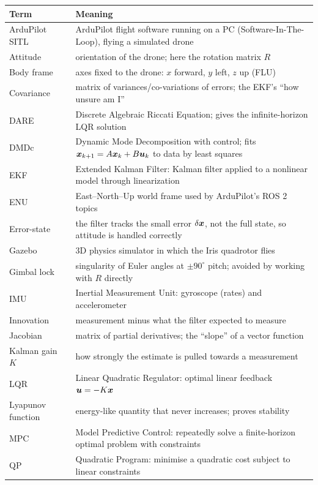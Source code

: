\begin{center}\small
\begin{tabularx}{\linewidth}{@{}l X@{}}
\toprule
\textbf{Term} & \textbf{Meaning}\\
\midrule
ArduPilot SITL & ArduPilot flight software running on a PC (Software-In-The-Loop), flying a simulated drone\\
Attitude & orientation of the drone; here the rotation matrix $R$\\
Body frame & axes fixed to the drone: $x$ forward, $y$ left, $z$ up (FLU)\\
Covariance & matrix of variances/co-variations of errors; the EKF's ``how unsure am I''\\
DARE & Discrete Algebraic Riccati Equation; gives the infinite-horizon LQR solution\\
DMDc & Dynamic Mode Decomposition with control; fits $\bm{x}_{k+1}=A\bm{x}_k+B\bm{u}_k$ to data by least squares\\
EKF & Extended Kalman Filter: Kalman filter applied to a nonlinear model through linearization\\
ENU & East--North--Up world frame used by ArduPilot's ROS 2 topics\\
Error-state & the filter tracks the small error $\delta\bm{x}$, not the full state, so attitude is handled correctly\\
Gazebo & 3D physics simulator in which the Iris quadrotor flies\\
Gimbal lock & singularity of Euler angles at $\pm90^\circ$ pitch; avoided by working with $R$ directly\\
IMU & Inertial Measurement Unit: gyroscope (rates) and accelerometer\\
Innovation & measurement minus what the filter expected to measure\\
Jacobian & matrix of partial derivatives; the ``slope'' of a vector function\\
Kalman gain $K$ & how strongly the estimate is pulled towards a measurement\\
LQR & Linear Quadratic Regulator: optimal linear feedback $\bm{u}=-K\bm{x}$\\
Lyapunov function & energy-like quantity that never increases; proves stability\\
MPC & Model Predictive Control: repeatedly solve a finite-horizon optimal problem with constraints\\
QP & Quadratic Program: minimise a quadratic cost subject to linear constraints\\

\end{tabularx}
\end{center}
